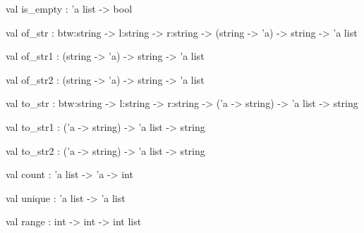 \documentclass[11pt]{article}
\begin{document}
\begin{ocamldocsigend}
\label{val:Util.L.is-underscoreempty}\begin{ocamldoccode}
val is_empty : 'a list -> bool
\end{ocamldoccode}


\label{val:Util.L.of-underscorestr}\begin{ocamldoccode}
val of_str :
  btw:string -> l:string -> r:string -> (string -> 'a) -> string -> 'a list
\end{ocamldoccode}


\label{val:Util.L.of-underscorestr1}\begin{ocamldoccode}
val of_str1 : (string -> 'a) -> string -> 'a list
\end{ocamldoccode}


\label{val:Util.L.of-underscorestr2}\begin{ocamldoccode}
val of_str2 : (string -> 'a) -> string -> 'a list
\end{ocamldoccode}


\label{val:Util.L.to-underscorestr}\begin{ocamldoccode}
val to_str :
  btw:string -> l:string -> r:string -> ('a -> string) -> 'a list -> string
\end{ocamldoccode}


\label{val:Util.L.to-underscorestr1}\begin{ocamldoccode}
val to_str1 : ('a -> string) -> 'a list -> string
\end{ocamldoccode}


\label{val:Util.L.to-underscorestr2}\begin{ocamldoccode}
val to_str2 : ('a -> string) -> 'a list -> string
\end{ocamldoccode}


\label{val:Util.L.count}\begin{ocamldoccode}
val count : 'a list -> 'a -> int
\end{ocamldoccode}


\label{val:Util.L.unique}\begin{ocamldoccode}
val unique : 'a list -> 'a list
\end{ocamldoccode}


\label{val:Util.L.range}\begin{ocamldoccode}
val range : int -> int -> int list
\end{ocamldoccode}



\end{ocamldocsigend}
\end{document}
